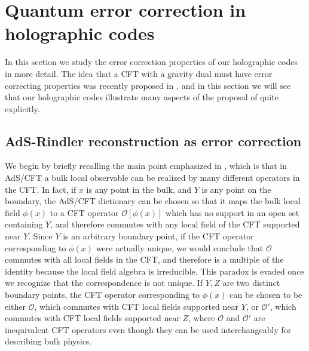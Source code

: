 \documentclass[12pt]{article}
\theoremstyle{plain}
\theoremstyle{plain}
\theoremstyle{plain}
\theoremstyle{plain}
\theoremstyle{result}
\theoremstyle{remark}
\theoremstyle{conjecture}
\theoremstyle{observation}
\theoremstyle{definition}
\theoremstyle{corollary}
\theoremstyle{definition}
\theoremstyle{definition}
\theoremstyle{assumption}
\theoremstyle{definition}
\theoremstyle{problem}
\theoremstyle{fact}
\begin{document}
\section{Quantum error correction in holographic codes}\label{sec:code}
In this section we study the error correction properties of our holographic codes in more detail.  The idea that a CFT with a gravity dual must have error correcting properties was recently proposed in \cite{Almheiri14}, and in this section we will see that our holographic codes illustrate many aspects of the proposal of \cite{Almheiri14} quite explicitly.  

\subsection{AdS-Rindler reconstruction as error correction}
We begin by briefly recalling the main point emphasized in \cite{Almheiri14}, which is that in AdS/CFT a bulk local observable can be realized by many different operators in the CFT. In fact, if $x$ is any point in the bulk, and $Y$ is any point on the boundary, the AdS/CFT dictionary can be chosen so that it maps the bulk local field $\phi(x)$ to a CFT operator $\mathcal{O}[\phi(x)]$ which has no support in an open set containing $Y$, and therefore commutes with any local field of the CFT supported near $Y$. Since $Y$ is an arbitrary boundary point, if the CFT operator corresponding to $\phi(x)$ were actually unique, we would conclude that $\mathcal{O}$ commutes with all local fields in the CFT, and therefore is a multiple of the identity because the local field algebra is irreducible. This paradox is evaded once we recognize that the correspondence is not unique. If $Y,Z$ are two distinct boundary points, the CFT operator corresponding to $\phi(x)$ can be chosen to be either $\mathcal{O}$, which commutes with CFT local fields supported near $Y$, or $\mathcal{O}'$, which commutes with CFT local fields supported near $Z$, where $\mathcal{O}$ and $\mathcal{O}'$ are inequivalent CFT operators even though they can be used interchangeably for describing bulk physics. 
\end{document}
